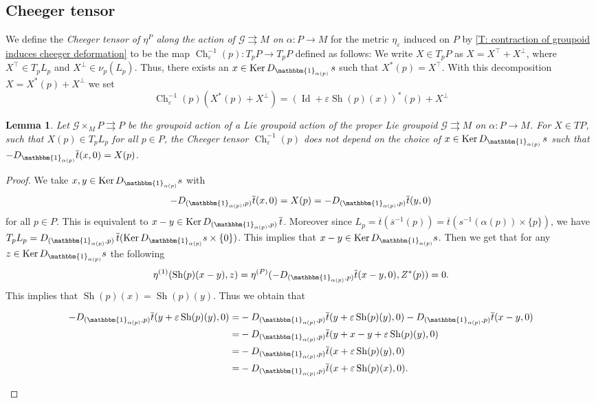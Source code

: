 \documentclass[12pt,a4paper,reqno]{amsart}
\DeclareMathOperator{\Ch}{Ch}
\DeclareMathOperator{\kernel}{Ker}
\DeclareMathOperator{\Id}{Id}
\DeclareMathOperator{\Sh}{Sh} %
\newcommand{\1}{\mathbbm{1}} %
\newcommand{\G}{\mathcal{G}} %
\newtheorem{lemma}[thm]{Lemma}
\theoremstyle{definition}
\theoremstyle{TheoremNum}
\begin{document}
\subsection{Cheeger tensor} We define the \emph{Cheeger tensor of $\eta^P$ along the action of $\G\rightrightarrows M$ on $\alpha\colon P\to M$} for the metric $\eta_\varepsilon$ induced on $P$ by  \th\ref{T: contraction of groupoid induces cheeger deformation} to be the map $\Ch^{-1}_\varepsilon(p)\colon T_p P\to T_pP$ defined as follows: We write $X\in T_pP$ as $X = X^\top+X^\perp$, where $X^\top \in T_pL_p$ and $X^\perp \in \nu_p(L_p)$. Thus, there exists an $x\in \kernel D_{\1_{\alpha(p)}}\, s$ such that $X^\ast(p) = X^\top$. With this decomposition $X = X^\ast(p)+X^\perp$ we set
\[
\Ch^{-1}_\varepsilon(p)(X^\ast(p)+X^\perp ) = (\Id+\varepsilon\Sh(p)(x))^\ast(p)+X^\perp
\]

\begin{lemma}\th\label{L: Cheeger tensor does not depend of choice of x such that xast is X}
Let $\G\times_M P\rightrightarrows P$ be the groupoid action of a Lie groupoid action of the proper Lie groupoid $\G\rightrightarrows M$ on $\alpha\colon P\to M$. For $X\in TP$, such that $X(p)\in T_p L_p$ for all $p\in P$, the Cheeger tensor $\Ch^{-1}_\varepsilon(p)$ does not depend on the choice of $x\in \kernel D_{\1_{\alpha(p)}}\, s$ such that $-D_{\1_{\alpha(p)}}\overline{t}(x,0) = X(p)$. 
\end{lemma}

\begin{proof}
We take $x,y\in  \kernel D_{\1_{\alpha(p)}} s$ with 
\[-D_{(\1_{\alpha(p)},p)}\overline{t}(x,0) = X(p) = -D_{(\1_{\alpha(p)},p)}\overline{t}(y,0)
\] for all $p\in P$. This is equivalent to  $x-y\in \kernel D_{(\1_{\alpha(p)},p)}\,\overline{t}$. Moreover since $L_p =\overline{t}(\overline{s}^{-1}(p)) = \overline{t}(s^{-1}(\alpha(p))\times\{p\})$, we have $T_p L_p = D_{(\1_{\alpha(p)},p)}\,\overline{t}(\kernel D_{\1_{\alpha(p)}} s\times \{0\})$. This implies that $x-y\in \kernel D_{\1_{\alpha(p)}} s$. Then we get that for any $z\in \kernel D_{\1_{\alpha(p)}} s$ the following
\[
\eta^{(1)}(\Sh(p)(x-y),z) = \eta^{(P)}(-D_{(\1_{\alpha(p)},p)}\overline{t}(x-y,0), Z^\ast(p)) = 0.
\]
This implies that $\Sh(p)(x) = \Sh(p)(y)$. Thus we obtain that 
\begin{linenomath}
\begin{align*}
-D_{(\1_{\alpha(p)},p)}\overline{t}(y+\varepsilon\Sh(p)(y),0) =&  -D_{(\1_{\alpha(p)},p)}\overline{t}(y+\varepsilon\Sh(p)(y),0)- D_{(\1_{\alpha(p)},p)}\overline{t}(x-y,0)\\
=& -D_{(\1_{\alpha(p)},p)}\overline{t}(y+x-y+\varepsilon\Sh(p)(y),0)\\
=& -D_{(\1_{\alpha(p)},p)}\overline{t}(x+\varepsilon\Sh(p)(y),0)\\
=& -D_{(\1_{\alpha(p)},p)}\overline{t}(x+\varepsilon\Sh(p)(x),0).
\end{align*}
\end{linenomath}
\end{proof}
\end{document}
